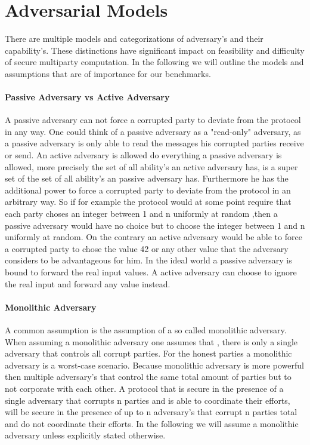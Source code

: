 \section{Adversarial Models}
\label{sec:Adversarial Models}
There are multiple models and categorizations of adversary's and their capability's. These distinctions have significant impact on feasibility and difficulty of secure multiparty computation. In the following we will outline the models and assumptions that are of importance for our benchmarks. 

\paragraph{Passive Adversary vs Active Adversary}
A passive adversary can not force a corrupted party to deviate from the protocol in any way. One could think of a passive adversary as a "read-only" adversary, as a passive adversary is only able to read the messages his corrupted parties receive or send. An active adversary is allowed do everything a passive adversary is allowed, more precisely the set of all ability's an active adversary has, is a super set of the set of all ability's an passive adversary has. Furthermore he has the additional power to force a corrupted party to deviate from the protocol in an arbitrary way. So if for example the protocol would at some point require that each party choses an integer between 1 and n uniformly at random ,then a passive adversary would have no choice but to choose the integer between 1 and n uniformly at random. 
On the contrary an active adversary would be able to force a corrupted party to chose the value 42 or any other value that the adversary considers to be advantageous for him. In the ideal world a passive adversary is bound to forward the real input values. A active adversary can choose to ignore the real input and forward any value instead.

\paragraph{Monolithic Adversary}
A common assumption is the assumption of a so called monolithic adversary. When assuming a monolithic adversary one assumes that , there is only a single adversary that controls all corrupt parties. For the honest parties a monolithic adversary is a worst-case scenario. Because monolithic adversary is more powerful then multiple adversary's that control the same total amount of parties but to not corporate with each other. A protocol that is secure in the presence of a single adversary that corrupts n parties and is able to coordinate their efforts, will be secure in the presence of up to n adversary's that corrupt n parties total and do not coordinate their efforts. In the following we will assume a monolithic adversary unless explicitly stated otherwise.
